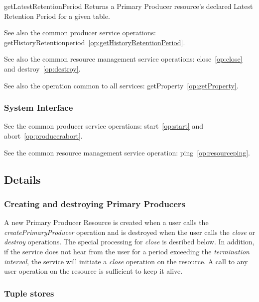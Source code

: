 \begin{method}{getLatestRetentionPeriod}
\desc Returns a Primary Producer resource's declared Latest Retention Period for
a given table.
\end{method}

See also the common producer service operations:
getHistoryRetentionperiod~\ref{op:getHistoryRetentionPeriod}.

See also the common resource management service operations:
close~\ref{op:close} and
destroy~\ref{op:destroy}.

See also the operation common to all services:
getProperty~\ref{op:getProperty}.

\subsubsection{System Interface}

See  the common producer service operations:
start~\ref{op:start} and abort~\ref{op:producerabort}.

See the common resource management service operation:
ping~\ref{op:resourceping}.

\subsection{Details}
\subsubsection{Creating and destroying Primary Producers}\label{sec:PrimaryProducerCreating}

A new Primary Producer Resource is created when a user calls the
\textit{createPrimaryProducer} operation and is destroyed when the
user calls the \textit{close} or \textit{destroy} operations. The
special processing for \textit{close} is desribed below. In addition,
if the service does not hear from the user for a period exceeding the
\textit{termination interval}, the service
will initiate a \textit{close} operation on the resource. A call to
any user operation on the resource is sufficient to keep it alive.

\subsubsection{Tuple stores}\label{sec:PrimaryProducerTupleStores}

